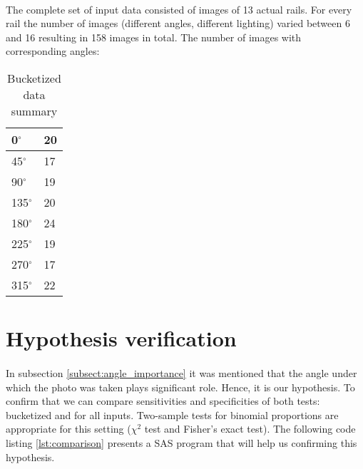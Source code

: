 \paragraph{}
The complete set of input data consisted of images of 13 actual rails. For every rail the number of images (different angles, different lighting) varied between 6 and 16 resulting in 158 images in total. The number of images with corresponding angles:
\begin{table}[H]
	\centering
	\begin{tabular}{|l|l|}
		\hline
		0$^{\circ}$		& 20 \\
		\hline
		45$^{\circ}$ 	& 17 \\
		\hline
		90$^{\circ}$ 	& 19 \\
		\hline
		135$^{\circ}$ 	& 20 \\
		\hline
		180$^{\circ}$ 	& 24 \\
		\hline
		225$^{\circ}$ 	& 19 \\
		\hline
		270$^{\circ}$ 	& 17 \\
		\hline
		315$^{\circ}$ 	& 22 \\
		\hline
	\end{tabular}
	\caption{Bucketized data summary}	
\end{table}

\section{Hypothesis verification}
\paragraph{}
In subsection \ref{subsect:angle_importance} it was mentioned that the angle under which the photo was taken plays significant role. Hence, it is our hypothesis. To confirm that we can compare sensitivities and specificities of both tests: bucketized and for all inputs. Two-sample tests for binomial proportions are appropriate for this setting ($\chi^2$ test and Fisher's exact test)\cite{diagnostic-testing}. The following code listing \ref{lst:comparison} presents a SAS program that will help us confirming this hypothesis.

